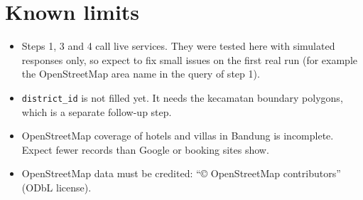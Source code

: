 \documentclass[11pt,a4paper]{article}
\begin{document}
\section{Known limits}
\begin{itemize}[leftmargin=*]
\item Steps 1, 3 and 4 call live services. They were tested here with simulated responses only, so expect to fix small issues on the first real run (for example the OpenStreetMap area name in the query of step 1).
\item \texttt{district\_id} is not filled yet. It needs the kecamatan boundary polygons, which is a separate follow-up step.
\item OpenStreetMap coverage of hotels and villas in Bandung is incomplete. Expect fewer records than Google or booking sites show.
\item OpenStreetMap data must be credited: ``\copyright{} OpenStreetMap contributors'' (ODbL license).
\end{itemize}
\end{document}
